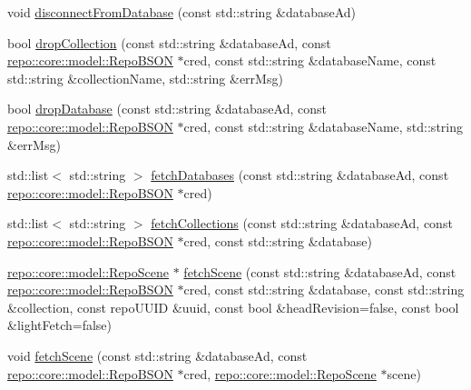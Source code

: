 \begin{DoxyCompactItemize}
void \hyperlink{classrepo_1_1manipulator_1_1_repo_manipulator_a98712acdd65c6ec4b2eb7d12269467cc}{disconnect\+From\+Database} (const std\+::string \&database\+Ad)
\item 
bool \hyperlink{classrepo_1_1manipulator_1_1_repo_manipulator_a8a24f7bb9d8abbb3fc852d61b9eee5cc}{drop\+Collection} (const std\+::string \&database\+Ad, const \hyperlink{classrepo_1_1core_1_1model_1_1_repo_b_s_o_n}{repo\+::core\+::model\+::\+Repo\+B\+S\+O\+N} $\ast$cred, const std\+::string \&database\+Name, const std\+::string \&collection\+Name, std\+::string \&err\+Msg)
\item 
bool \hyperlink{classrepo_1_1manipulator_1_1_repo_manipulator_a83b078b648218f271c2ea793c0e23d48}{drop\+Database} (const std\+::string \&database\+Ad, const \hyperlink{classrepo_1_1core_1_1model_1_1_repo_b_s_o_n}{repo\+::core\+::model\+::\+Repo\+B\+S\+O\+N} $\ast$cred, const std\+::string \&database\+Name, std\+::string \&err\+Msg)
\item 
std\+::list$<$ std\+::string $>$ \hyperlink{classrepo_1_1manipulator_1_1_repo_manipulator_ae668256201fbaf733c579e78986d3049}{fetch\+Databases} (const std\+::string \&database\+Ad, const \hyperlink{classrepo_1_1core_1_1model_1_1_repo_b_s_o_n}{repo\+::core\+::model\+::\+Repo\+B\+S\+O\+N} $\ast$cred)
\item 
std\+::list$<$ std\+::string $>$ \hyperlink{classrepo_1_1manipulator_1_1_repo_manipulator_a0fa334bdd79ae7b402fb9a0b8c91e3f3}{fetch\+Collections} (const std\+::string \&database\+Ad, const \hyperlink{classrepo_1_1core_1_1model_1_1_repo_b_s_o_n}{repo\+::core\+::model\+::\+Repo\+B\+S\+O\+N} $\ast$cred, const std\+::string \&database)
\item 
\hyperlink{classrepo_1_1core_1_1model_1_1_repo_scene}{repo\+::core\+::model\+::\+Repo\+Scene} $\ast$ \hyperlink{classrepo_1_1manipulator_1_1_repo_manipulator_aad9651797157bcc3285316ca9d92ae1d}{fetch\+Scene} (const std\+::string \&database\+Ad, const \hyperlink{classrepo_1_1core_1_1model_1_1_repo_b_s_o_n}{repo\+::core\+::model\+::\+Repo\+B\+S\+O\+N} $\ast$cred, const std\+::string \&database, const std\+::string \&collection, const repo\+U\+U\+I\+D \&uuid, const bool \&head\+Revision=false, const bool \&light\+Fetch=false)
\item 
void \hyperlink{classrepo_1_1manipulator_1_1_repo_manipulator_a471f3ea5c0601b7170e78c945b1960e9}{fetch\+Scene} (const std\+::string \&database\+Ad, const \hyperlink{classrepo_1_1core_1_1model_1_1_repo_b_s_o_n}{repo\+::core\+::model\+::\+Repo\+B\+S\+O\+N} $\ast$cred, \hyperlink{classrepo_1_1core_1_1model_1_1_repo_scene}{repo\+::core\+::model\+::\+Repo\+Scene} $\ast$scene)

\end{DoxyCompactItemize}
